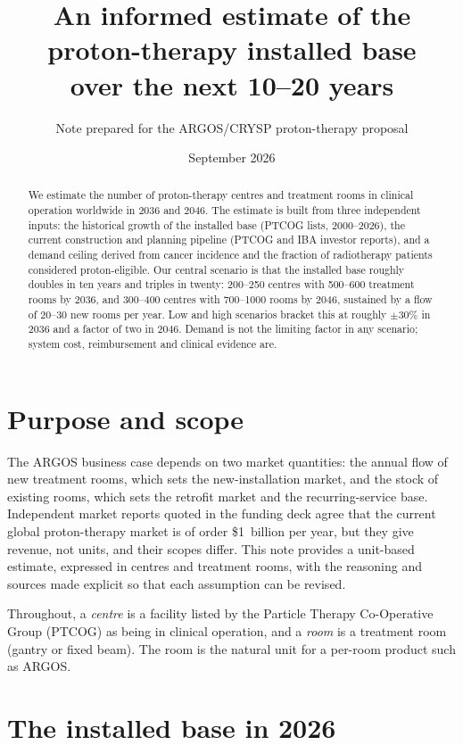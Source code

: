 \documentclass[11pt,a4paper]{article}
\title{An informed estimate of the proton-therapy installed base\\over the next 10--20 years}
\author{Note prepared for the ARGOS/CRYSP proton-therapy proposal}
\date{September 2026}
\begin{document}
\maketitle

\begin{abstract}
We estimate the number of proton-therapy centres and treatment rooms in clinical
operation worldwide in 2036 and 2046. The estimate is built from three
independent inputs: the historical growth of the installed base (PTCOG lists,
2000--2026), the current construction and planning pipeline (PTCOG and IBA
investor reports), and a demand ceiling derived from cancer incidence and the
fraction of radiotherapy patients considered proton-eligible. Our central
scenario is that the installed base roughly doubles in ten years and triples in
twenty: 200--250 centres with 500--600 treatment rooms by 2036, and 300--400
centres with 700--1000 rooms by 2046, sustained by a flow of 20--30 new rooms
per year. Low and high scenarios bracket this at roughly $\pm 30\%$ in 2036 and
a factor of two in 2046. Demand is not the limiting factor in any scenario;
system cost, reimbursement and clinical evidence are.
\end{abstract}

\section{Purpose and scope}

The ARGOS business case depends on two market quantities: the annual flow of new
treatment rooms, which sets the new-installation market, and the stock of
existing rooms, which sets the retrofit market and the recurring-service base.
Independent market reports quoted in the funding deck agree that the current
global proton-therapy market is of order \$1~billion per year, but they give
revenue, not units, and their scopes differ. This note provides a unit-based
estimate, expressed in centres and treatment rooms, with the reasoning and
sources made explicit so that each assumption can be revised.

Throughout, a \emph{centre} is a facility listed by the Particle Therapy
Co-Operative Group (PTCOG) as being in clinical operation, and a \emph{room} is a
treatment room (gantry or fixed beam). The room is the natural unit for a
per-room product such as ARGOS.

\section{The installed base in 2026}
\end{document}
